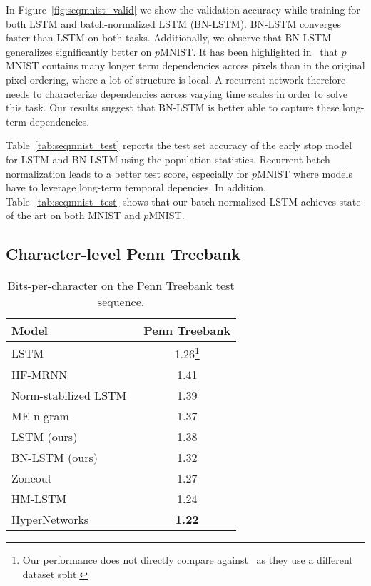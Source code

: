 \documentclass{article} \pdfoutput=1 \usepackage[utf8]{inputenc}
\begin{document}
In Figure~\ref{fig:seqmnist_valid} we show the validation accuracy while
training for both LSTM and batch-normalized LSTM (BN-LSTM).  BN-LSTM converges
faster than LSTM on both tasks.  Additionally, we observe that BN-LSTM
generalizes significantly better on $p$MNIST.  It has been highlighted
in~\cite{urnn} that $p$MNIST contains many longer term dependencies across
pixels than in the original pixel ordering, where a lot of structure is local.
A recurrent network therefore needs to characterize dependencies across varying
time scales in order to solve this task.  Our results suggest that BN-LSTM is
better able to capture these long-term dependencies.

Table~\ref{tab:seqmnist_test} reports the test set accuracy of the early stop
model for LSTM and BN-LSTM using the population statistics.  Recurrent batch
normalization leads to a better test score, especially for $p$MNIST where
models have to leverage long-term temporal depencies.  In addition,
Table~\ref{tab:seqmnist_test} shows that our batch-normalized LSTM achieves
state of the art on both MNIST and $p$MNIST.

\subsection{Character-level Penn Treebank}
\begin{table}\center
\begin{tabular}{@{}lc@{}}
  \toprule
  \bf Model & \bf Penn Treebank \\
  \midrule
  LSTM~\citep{graves2013generating} &  1.26\footnote{Our performance does not directly compare against~\citet{graves2013generating} as they use a different dataset split.}\\
  \midrule
  HF-MRNN~\citep{mikolov2012subword} & 1.41 \\
  Norm-stabilized LSTM~\citep{krueger} & 1.39 \\
  ME n-gram~\citep{mikolov2012subword} & 1.37 \\
  \midrule
  LSTM (ours) & 1.38 \\
  BN-LSTM (ours) & 1.32 \\
  \midrule
  Zoneout~\citep{krueger2016zoneout} & 1.27 \\
  HM-LSTM~\citep{chung2016hierarchical} & 1.24 \\
  HyperNetworks~\citep{ha2016hypernetworks} & \textbf{1.22} \\
  \bottomrule
\end{tabular}
\caption{Bits-per-character on the Penn Treebank test sequence.}
\label{tab:ptb_test}
\end{table}
\end{document}

